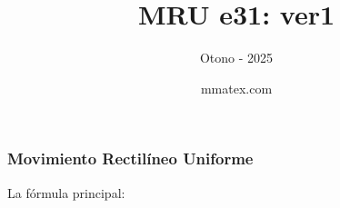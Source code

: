 \documentclass{beamer}
\title{MRU e31: ver1}
\subtitle{Otono - 2025}
\author{mmatex.com}
\begin{document}
\maketitle

\begin{frame}
\frametitle{Movimiento Rectil\'ineo Uniforme}
% 
 La f\'ormula principal:

                                                               
 
{\huge \vmru}
\vNUa
                                                               
                                                               
                                                               
                                                               
\end{frame}
\end{document}
